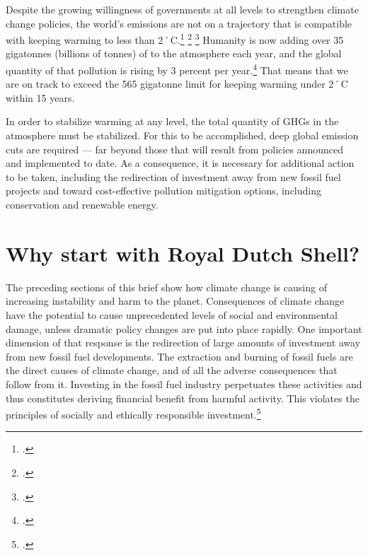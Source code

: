 \documentclass[10pt]{article}
\begin{document}
		




Despite the growing willingness of governments at all levels to strengthen climate change policies, the world's emissions are not on a trajectory that is compatible with keeping warming to less than 2˚C.\footcite[See: ][]{ChallengeTwoDegrees} \footcite[][]{AggressiveMeasures2012} \footcite[][p. 280--2]{Stocker2013}
Humanity is now adding over 35 gigatonnes (billions of tonnes) of  to the atmosphere each year, and the global quantity of that pollution is rising by 3 percent per year.\footcite[][p. 26]{IPCCar4_syr}
That means that we are on track to exceed the 565 gigatonne limit for keeping warming under 2˚C within 15 years.



In order to stabilize warming at any level, the total quantity of GHGs in the atmosphere must be stabilized.
For this to be accomplished, deep global emission cuts are required --- far beyond those that will result from policies announced and implemented to date.
As a consequence, it is necessary for additional action to be taken, including the redirection of investment away from new fossil fuel projects and toward cost-effective pollution mitigation options, including conservation and renewable energy.









\clearpage



		\singlespacing
		\section{Why start with Royal Dutch Shell?}
		\label{sec:Shell}
		\doublespacing






The preceding sections of this brief show how climate change is causing of increasing instability and harm to the planet.
Consequences of climate change have the potential to cause unprecedented levels of social and environmental damage, unless dramatic policy changes are put into place rapidly. 
One important dimension of that response is the redirection of large amounts of investment away from new fossil fuel developments.
The extraction and burning of fossil fuels are the direct causes of climate change, and of all the adverse consequences that follow from it. 
Investing in the fossil fuel industry perpetuates these activities and thus constitutes deriving financial benefit from harmful activity.
This violates the principles of socially and ethically responsible investment.\footcite[][]{Richardson_2008}
\end{document}
